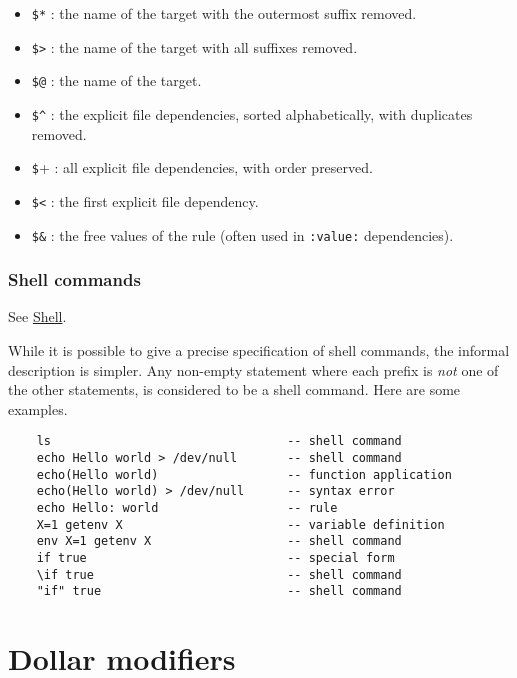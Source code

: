 \begin{itemize}
\item \verb+$*+ : the name of the target with the outermost suffix removed.
\item \verb+$>+ : the name of the target with all suffixes removed.
\item \verb+$@+ : the name of the target.
\item \verb+$^+ : the explicit file dependencies, sorted alphabetically, with duplicates removed.
\item \verb+$++ : all explicit file dependencies, with order preserved.
\item \verb+$<+ : the first explicit file dependency.
\item \verb+$&+ : the free values of the rule (often used in \verb+:value:+ dependencies).
\end{itemize}

\subsubsection{Shell commands}

See \href{omake-shell.html#shell}{Shell}.

While it is possible to give a precise specification of shell commands, the informal description is
simpler.  Any non-empty statement where each prefix is \emph{not} one of the other statements, is
considered to be a shell command.  Here are some examples.

\begin{verbatim}
    ls                                 -- shell command
    echo Hello world > /dev/null       -- shell command
    echo(Hello world)                  -- function application
    echo(Hello world) > /dev/null      -- syntax error
    echo Hello: world                  -- rule
    X=1 getenv X                       -- variable definition
    env X=1 getenv X                   -- shell command
    if true                            -- special form
    \if true                           -- shell command
    "if" true                          -- shell command
\end{verbatim}
    

%
\hypertarget{dollar}{}
\section{Dollar modifiers}


